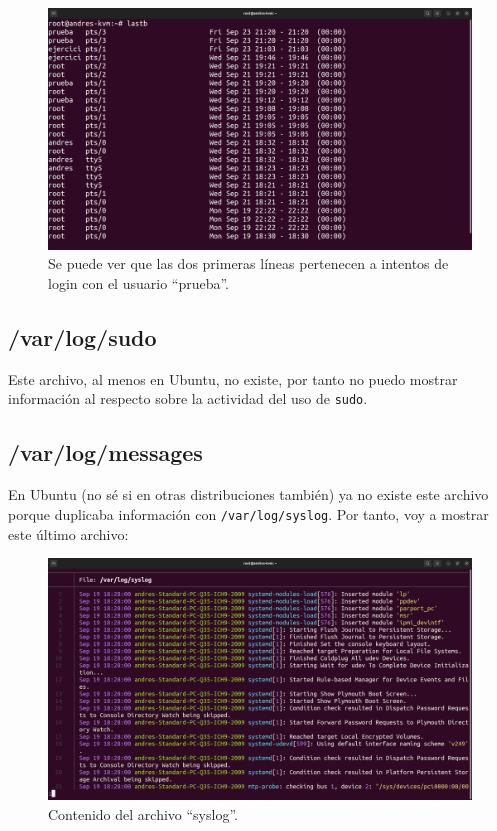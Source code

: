 \documentclass{article}
\begin{document}
\begin{figure}[H]
    \includegraphics[width=\textwidth]{imagenes/lastbpruebafirst.png}
    \caption{Se puede ver que las dos primeras líneas pertenecen a intentos de login con el usuario ``prueba''.}
\end{figure}

\subsection{/var/log/sudo}
Este archivo, al menos en Ubuntu, no existe, por tanto no puedo mostrar información al respecto sobre la actividad del uso de \verb|sudo|.

\subsection{/var/log/messages}
En Ubuntu (no sé si en otras distribuciones también) ya no existe este archivo porque duplicaba información con \verb|/var/log/syslog|. Por tanto, voy a mostrar este último archivo:

\begin{figure}[H]
    \includegraphics[width=\textwidth]{imagenes/syslog.png}
    \caption{Contenido del archivo ``syslog''.}
\end{figure}
\end{document}
